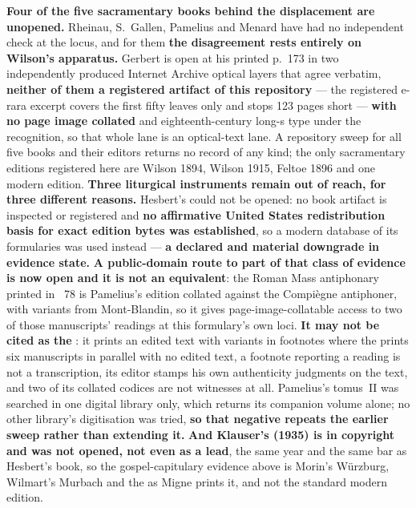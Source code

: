 \textbf{Four of the five sacramentary books behind the displacement are
unopened.} Rheinau, S.~Gallen, Pamelius and Menard have had no independent check
at the locus, and for them \textbf{the disagreement rests entirely on Wilson's
apparatus.} Gerbert is open at his printed p.~173 in two independently produced
Internet Archive optical layers that agree verbatim, \textbf{neither of them a
registered artifact of this repository} --- the registered e-rara excerpt covers
the first fifty leaves only and stops 123 pages short --- \textbf{with no page
image collated} and eighteenth-century long-s type under the recognition, so
that whole lane is an optical-text lane. A repository sweep for all five books and their editors returns no
record of any kind; the only sacramentary editions registered here are Wilson
1894, Wilson 1915, Feltoe 1896 and one modern edition. \textbf{Three liturgical
instruments remain out of reach, for three different reasons.} Hesbert's
 could not be opened: no book artifact is
inspected or registered and \textbf{no affirmative United States redistribution
basis for exact edition bytes was established}, so a modern database of its
formularies was used instead --- \textbf{a declared and material downgrade in
evidence state.} \textbf{A public-domain route to part of that class of
evidence is now open and it is not an equivalent}: the Roman Mass antiphonary
printed in ~78 is Pamelius's edition collated against
the Compiègne antiphoner, with variants from Mont-Blandin, so it gives
page-image-collatable access to two of those manuscripts' readings at this
formulary's own loci. \textbf{It may not be cited as the }: it
prints an edited text with variants in footnotes where the 
prints six manuscripts in parallel with no edited text, a footnote reporting a
reading is not a transcription, its editor stamps his own authenticity judgments
on the text, and two of its collated codices are not  witnesses
at all. Pamelius's  tomus~II was searched in
one digital library only, which returns its companion volume alone; no other
library's digitisation was tried, \textbf{so that negative repeats the earlier
sweep rather than extending it.} \textbf{And Klauser's  (1935) is in copyright and was not opened, not even as a lead},
the same year and the same bar as Hesbert's book, so the gospel-capitulary
evidence above is Morin's Würzburg, Wilmart's Murbach and the  as Migne prints it, and not the standard modern edition.

